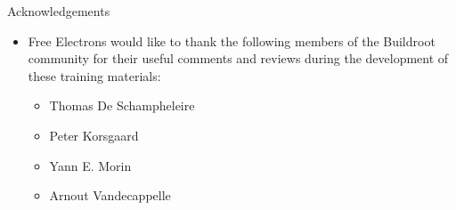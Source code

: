 \begin{frame}{Acknowledgements}

  \begin{itemize}

  \item Free Electrons would like to thank the following members of
    the Buildroot community for their useful comments and reviews
    during the development of these training materials:
    \begin{itemize}
    \item Thomas De Schampheleire
    \item Peter Korsgaard
    \item Yann E. Morin
    \item Arnout Vandecappelle
    \end{itemize}
  \end{itemize}

\end{frame}
